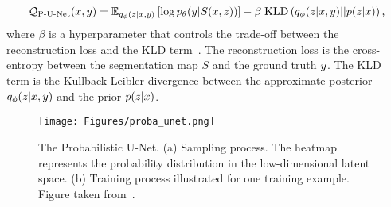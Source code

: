 \begin{equation*}
    \mathcal{Q}_{\text{P-U-Net}}(x,y) = 
    \mathbb{E}_{q_{\phi}(z|x, y)}
    \left[\log p_{\theta}(y|S(x, z))\right] 
    -\beta\; \text{KLD}\left(q_{\phi}(z|x,y)||p(z|x)\right) 
    \text{,}
\end{equation*}
where $\beta$ is a hyperparameter that controls the trade-off between the
reconstruction loss and the KLD term~\citep{higgins2017beta}.
The reconstruction loss is the cross-entropy between the segmentation map $S$ and
the ground truth $y$.
The KLD term is the Kullback-Leibler divergence between the
approximate posterior $q_{\phi}(z|x,y)$ and the prior
$p(z|x)$.




\begin{figure}[htb!]
    \centering
    \texttt{[image: Figures/proba\_unet.png]}
    \caption{The Probabilistic U-Net. (a) Sampling process. 
    The heatmap represents the
    probability distribution in the low-dimensional latent space. 
    (b) Training process illustrated for one training example.
    Figure taken from~\citep{kohl2018probabilistic}. }
    \label{fig:proba_unet}
\end{figure}




